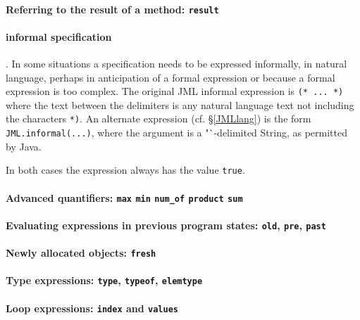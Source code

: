 \paragraph{Referring to the result of a method: \texttt{\bs result}}

\paragraph{informal specification}. In some situations a specification needs to be expressed informally, in natural language, perhaps in anticipation of a formal expression or because a formal expression is too complex. The original JML informal expression is
{\center \texttt{(* ... *)}}
where the text between the delimiters is any natural language text not including the characters \texttt{*)}. 
An alternate expression (cf. \S\ref{JMLlang}) is the form \texttt{JML.informal(...)}, where the argument is a "`-delimited String, as permitted by Java.

In both cases the expression always has the value \texttt{true}.



\paragraph{Advanced quantifiers: \texttt{\bs max} \texttt{\bs min}
                \texttt{\bs num\_of} \texttt{\bs product} \texttt{\bs sum}}

\paragraph{Evaluating expressions in previous program states: \texttt{\bs old}, \texttt{\bs pre}, \texttt{\bs past}}

\paragraph{Newly allocated objects: \texttt{\bs fresh}}

\paragraph{Type expressions: \texttt{\bs type}, \texttt{\bs typeof}, \texttt{\bs elemtype}}

\paragraph{Loop expressions: \texttt{\bs index} and \texttt{\bs values}}


